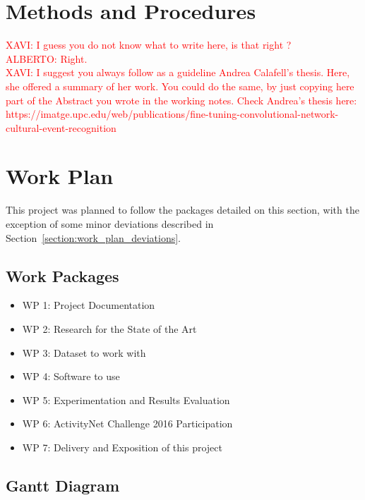 
\section{Methods and Procedures}

\textcolor{red}{XAVI: I guess you do not know what to write here, is that right ? \\ALBERTO: Right. \\XAVI: I suggest you always follow as a guideline Andrea Calafell's thesis. Here, she offered a summary of her work. You could do the same, by just copying here part of the Abstract you wrote in the working notes. Check Andrea's thesis here: https://imatge.upc.edu/web/publications/fine-tuning-convolutional-network-cultural-event-recognition}

\section{Work Plan}

This project was planned to follow the packages detailed on this section, with the exception of some minor deviations described in Section~\ref{section:work_plan_deviations}.

\subsection{Work Packages}

\begin{itemize}
    \item WP 1: Project Documentation
    \item WP 2: Research for the State of the Art
    \item WP 3: Dataset to work with
    \item WP 4: Software to use
    \item WP 5: Experimentation and Results Evaluation
    \item WP 6: ActivityNet Challenge 2016 Participation
    \item WP 7: Delivery and Exposition of this project
\end{itemize}

\subsection{Gantt Diagram}

